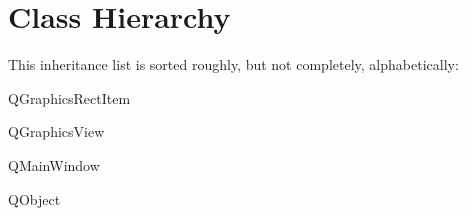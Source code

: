 \section{Class Hierarchy}
This inheritance list is sorted roughly, but not completely, alphabetically\+:\begin{DoxyCompactList}
\item Q\+Graphics\+Rect\+Item\begin{DoxyCompactList}
\item {}
\item {}
\item {}
\end{DoxyCompactList}
\item Q\+Graphics\+View\begin{DoxyCompactList}
\item {}
\end{DoxyCompactList}
\item Q\+Main\+Window\begin{DoxyCompactList}
\item {}
\end{DoxyCompactList}
\item Q\+Object\begin{DoxyCompactList}
\item {}
\end{DoxyCompactList}
\end{DoxyCompactList}
